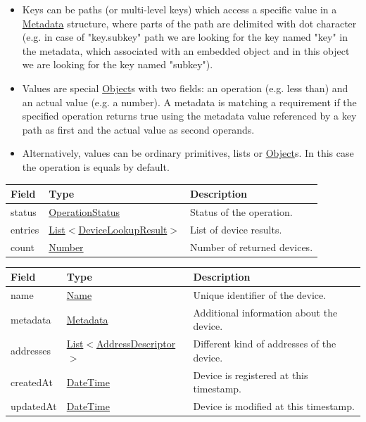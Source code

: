 \documentclass[a4paper]{arrowhead}
\newcommand{\pref}[1]{{\textcolor{ArrowheadGrey}{\hyperref[sec:model:primitives:#1]{#1}}}}
\begin{document}
\begin{itemize}
    \item Keys can be paths (or multi-level keys) which access a specific value in a \hyperref[sec:model:Metadata]{Metadata} structure, where parts of the path are delimited with dot character (e.g. in case of "key.subkey" path we are looking for the key named "key" in the metadata, which associated with an embedded object and in this object we are looking for the key named "subkey").
    \item Values are special \pref{Object}s with two fields: an operation (e.g. less than) and an actual value (e.g. a number). A metadata is matching a requirement if the specified operation returns true using the metadata value referenced by a key path as first and the actual value as second operands. 
    \item Alternatively, values can be ordinary primitives, lists or \pref{Object}s. In this case the operation is equals by default.
\end{itemize}

\label{sec:model:DeviceLookupResponse}

\begin{table}[ht!]
\begin{tabularx}{\textwidth}{| p{3cm} | p{6cm} | X |} \hline
\rowcolor{gray!33} Field & Type      & Description \\ \hline
status & \pref{OperationStatus} & Status of the operation. \\ \hline
entries & \pref{List}$<$\hyperref[sec:model:DeviceLookupResult]{DeviceLookupResult}$>$     & List of device results. \\ \hline
count & \pref{Number} & Number of returned devices. \\ \hline
\end{tabularx}
\end{table}

 
\begin{table}[ht!]
\begin{tabularx}{\textwidth}{| p{4.25cm} | p{4cm} | X |} \hline
\rowcolor{gray!33} Field & Type      & Description \\ \hline
name & \pref{Name} & Unique identifier of the device. \\ \hline
metadata & \hyperref[sec:model:Metadata]{Metadata} & Additional information about the device. \\ \hline
addresses &  \pref{List}$<$\hyperref[sec:model:AddressDescriptor]{AddressDescriptor}$>$ & Different kind of addresses of the device.  \\ \hline
createdAt & \pref{DateTime} & Device is registered at this timestamp. \\ \hline
updatedAt & \pref{DateTime} & Device is modified at this timestamp. \\ \hline
\end{tabularx}
\end{table}
\end{document}
